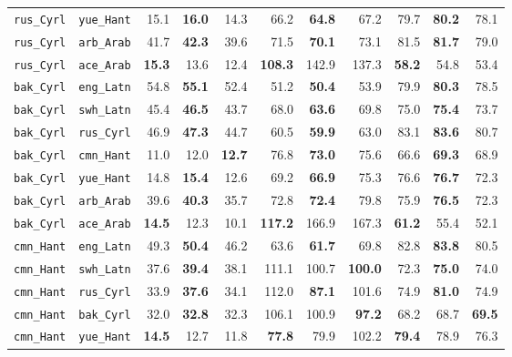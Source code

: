 \begin{longtable}{@{}ll rrr rrr rrr@{}}
\texttt{rus\_Cyrl} & \texttt{yue\_Hant} & 15.1 & \textbf{16.0} & 14.3 & 66.2 & \textbf{64.8} & 67.2 & 79.7 & \textbf{80.2} & 78.1 \\
\texttt{rus\_Cyrl} & \texttt{arb\_Arab} & 41.7 & \textbf{42.3} & 39.6 & 71.5 & \textbf{70.1} & 73.1 & 81.5 & \textbf{81.7} & 79.0 \\
\texttt{rus\_Cyrl} & \texttt{ace\_Arab} & \textbf{15.3} & 13.6 & 12.4 & \textbf{108.3} & 142.9 & 137.3 & \textbf{58.2} & 54.8 & 53.4 \\
\addlinespace
\texttt{bak\_Cyrl} & \texttt{eng\_Latn} & 54.8 & \textbf{55.1} & 52.4 & 51.2 & \textbf{50.4} & 53.9 & 79.9 & \textbf{80.3} & 78.5 \\
\texttt{bak\_Cyrl} & \texttt{swh\_Latn} & 45.4 & \textbf{46.5} & 43.7 & 68.0 & \textbf{63.6} & 69.8 & 75.0 & \textbf{75.4} & 73.7 \\
\texttt{bak\_Cyrl} & \texttt{rus\_Cyrl} & 46.9 & \textbf{47.3} & 44.7 & 60.5 & \textbf{59.9} & 63.0 & 83.1 & \textbf{83.6} & 80.7 \\
\texttt{bak\_Cyrl} & \texttt{cmn\_Hant} & 11.0 & 12.0 & \textbf{12.7} & 76.8 & \textbf{73.0} & 75.6 & 66.6 & \textbf{69.3} & 68.9 \\
\texttt{bak\_Cyrl} & \texttt{yue\_Hant} & 14.8 & \textbf{15.4} & 12.6 & 69.2 & \textbf{66.9} & 75.3 & 76.6 & \textbf{76.7} & 72.3 \\
\texttt{bak\_Cyrl} & \texttt{arb\_Arab} & 39.6 & \textbf{40.3} & 35.7 & 72.8 & \textbf{72.4} & 79.8 & 75.9 & \textbf{76.5} & 72.3 \\
\texttt{bak\_Cyrl} & \texttt{ace\_Arab} & \textbf{14.5} & 12.3 & 10.1 & \textbf{117.2} & 166.9 & 167.3 & \textbf{61.2} & 55.4 & 52.1 \\
\addlinespace
\texttt{cmn\_Hant} & \texttt{eng\_Latn} & 49.3 & \textbf{50.4} & 46.2 & 63.6 & \textbf{61.7} & 69.8 & 82.8 & \textbf{83.8} & 80.5 \\
\texttt{cmn\_Hant} & \texttt{swh\_Latn} & 37.6 & \textbf{39.4} & 38.1 & 111.1 & 100.7 & \textbf{100.0} & 72.3 & \textbf{75.0} & 74.0 \\
\texttt{cmn\_Hant} & \texttt{rus\_Cyrl} & 33.9 & \textbf{37.6} & 34.1 & 112.0 & \textbf{87.1} & 101.6 & 74.9 & \textbf{81.0} & 74.9 \\
\texttt{cmn\_Hant} & \texttt{bak\_Cyrl} & 32.0 & \textbf{32.8} & 32.3 & 106.1 & 100.9 & \textbf{97.2} & 68.2 & 68.7 & \textbf{69.5} \\
\texttt{cmn\_Hant} & \texttt{yue\_Hant} & \textbf{14.5} & 12.7 & 11.8 & \textbf{77.8} & 79.9 & 102.2 & \textbf{79.4} & 78.9 & 76.3 \\

\end{longtable}
